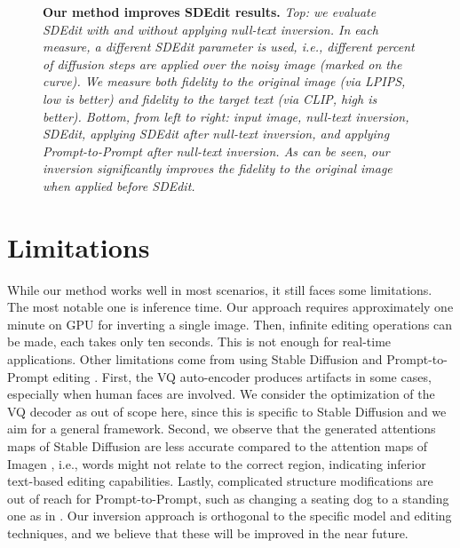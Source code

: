 \begin{figure}
\vspace{-0.25cm}
\caption{{\bf Our method improves SDEdit results.} {\it 
Top: we evaluate SDEdit with and without applying null-text inversion. 
In each measure, a different SDEdit parameter is used, i.e., different percent of diffusion steps are applied over the noisy image (marked on the curve). 
We measure both fidelity to the original image (via LPIPS, low is better) and fidelity to the target text (via CLIP, high is better).
Bottom, from left to right: input image, null-text inversion, SDEdit, applying SDEdit after null-text inversion, and applying Prompt-to-Prompt after null-text inversion. 
As can be seen, our inversion significantly improves the fidelity to the original image when applied before SDEdit. }}
\vspace{-0.4cm}
\label{fig:sdedit_null} \end{figure}





 

\section{Limitations}


While our method works well in most scenarios, it still faces some limitations. The most notable one is inference time. Our approach requires approximately one minute on GPU for inverting a single image. Then, infinite editing operations can be made, each takes only ten seconds. This is not enough for real-time applications.
Other limitations come from using Stable Diffusion \cite{rombach2021highresolution} and Prompt-to-Prompt editing \cite{hertz2022prompt}. First, the VQ auto-encoder produces artifacts in some cases, especially when human faces are involved. We consider the optimization of the VQ decoder as out of scope here, since this is specific to Stable Diffusion and we aim for a general framework. Second, we observe that the generated attentions maps of Stable Diffusion are less accurate compared to the attention maps of Imagen \cite{saharia2022photorealistic}, i.e., words might not relate to the correct region, indicating inferior text-based editing capabilities. 
Lastly, complicated structure modifications are out of reach for Prompt-to-Prompt, such as changing a seating dog to a standing one as in \cite{Kawar2022ImagicTR}.
Our inversion approach is orthogonal to the specific model and editing techniques, and we believe that these will be improved in the near future.











